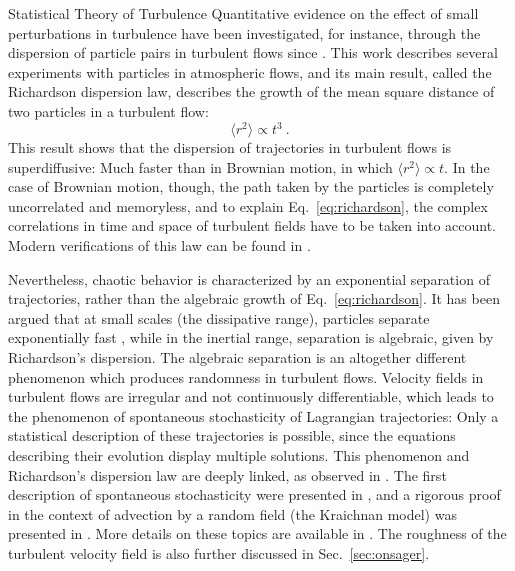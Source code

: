 \begin{chapter}{Statistical Theory of Turbulence}
Quantitative evidence on the effect of small perturbations in turbulence have been investigated, for instance, through the dispersion of particle pairs in turbulent flows since \textcite{richardson1926atmospheric}.
This work describes several experiments with particles in atmospheric flows, and its main result, called the Richardson dispersion law, describes the growth of the mean square distance of two particles in a turbulent flow:
\begin{equation} \label{eq:richardson}
    \langle r^2 \rangle \propto t^3 \ .
\end{equation}
This result shows that the dispersion of trajectories in turbulent flows is superdiffusive: Much faster than in Brownian motion,
in which $\langle r^2 \rangle \propto t$.
In the case of Brownian motion, though, the path taken by the particles is completely uncorrelated and memoryless, and to explain
Eq.~\eqref{eq:richardson}, the complex correlations in time and space
of turbulent fields have to be taken into account.
Modern verifications of this law can be found in \textcite{boffetta2002,bourgoin2006,salazar2009}.

Nevertheless, chaotic behavior is characterized by an exponential separation of trajectories, rather than the algebraic growth of Eq.~\eqref{eq:richardson}. It has been argued that at small scales (the dissipative range), particles separate exponentially fast \parencite{furstenberg1963,zeldovich1984}, while in the inertial range, separation is algebraic, given by Richardson's dispersion. The algebraic separation is an altogether different phenomenon which produces randomness in turbulent flows. Velocity fields in turbulent flows are irregular and not continuously differentiable, which leads to the phenomenon of spontaneous stochasticity of Lagrangian trajectories: Only a statistical description of these trajectories is possible, since the equations describing their evolution display multiple solutions. This phenomenon and Richardson's dispersion law are deeply linked, as observed in \textcite{bernard1998scaling,falkovich2001particles}.
The first description of spontaneous stochasticity were presented in \textcite{bernard1998scaling,gawedzki2000,gawedzki2002}, and a rigorous proof in the context of advection by a random field (the Kraichnan model) was presented in \textcite{lejan2002}. More details on these topics are available in \textcite{falkovich2001particles,eyink2008turbulence}. The roughness of the turbulent velocity field is also further discussed in Sec.~\ref{sec:onsager}.


\end{chapter}
